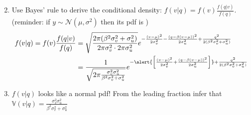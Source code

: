 \documentclass[english,10pt
,aspectratio=169
]{beamer}
\begin{document}
\begin{frame}%
	\begin{enumerate}
		\setcounter{enumi}{1}
		\item Use Bayes' rule to derive the conditional density: $f(v|q) = f(v) \frac{f(q|v)}{f(q)} $.
		\\
		(reminder: if $y \sim \mathcal{N}(\mu,\sigma^2)$ then its pdf is )
		\begin{align*}
			f(v|q) = f(v) \frac{f(q|v)}{f(q)} 
			&= \sqrt{\frac{2\pi (\beta^2 \sigma^2_v+\sigma^2_u)}{2 \pi \sigma^2_v \cdot 2 \pi \sigma^2_u}} e^{- \frac{(v-\mu)^2}{2\sigma^2_v} - \frac{(q-\beta(v-\mu))^2}{2\sigma^2_u } + \frac{q^2}{2(\beta^2 \sigma^2_v + \sigma^2_u)}}
			\\
			&= \frac{1}{\sqrt{2 \pi \frac{\sigma^2_v \sigma^2_u}{\beta^2 \sigma^2_v+\sigma^2_u}}} e^{-\alert{\left[ \frac{(v-\mu)^2}{2\sigma^2_v} + \frac{(q-\beta(v-\mu))^2}{2\sigma^2_u } \right]} + \frac{q^2}{2(\beta^2 \sigma^2_v + \sigma^2_u)}}
		\end{align*}
		\item $f(v|q)$ looks like a normal pdf! From the leading fraction infer that  $\mathbb{V}(v|q) = \frac{\sigma^2_v \sigma^2_u}{\beta^2 \sigma^2_v+\sigma^2_u}$
		
	\end{enumerate}
\end{frame}
\end{document}

